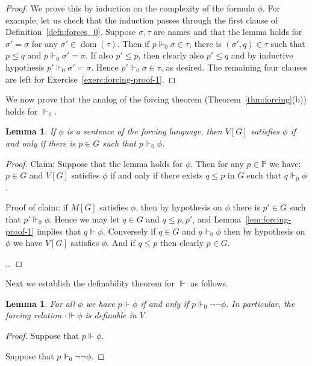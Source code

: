 \documentclass[11pt,oneside]{amsbook}
\newcommand{\forces}{\Vdash}
\newcommand{\PP}{\mathbb P}
\DeclareMathOperator{\dom}{dom}
\theoremstyle{definition}
\theoremstyle{plain}
\newtheorem{lem}[thm]{Lemma}
\theoremstyle{definition}
\theoremstyle{remark}
\begin{document}
\begin{proof}
  We prove this by induction on the complexity of the formula $\phi$. For example, let us check that the induction passes through the first clause of Definition~\ref{defn:forces_0}. Suppose $\sigma,\tau$ are names and that the lemma holds for $\sigma'=\sigma$ for any $\sigma'\in\dom(\tau)$. Then if $p\forces_0\sigma\in\tau$, there is $(\sigma',q)\in\tau$ such that $p\leq q$ and $p\forces_0\sigma'=\sigma$. If also $p'\leq p$, then clearly also $p'\leq q$ and by inductive hypothesis $p'\forces_0\sigma'=\sigma$. Hence $p'\forces_0\sigma\in\tau$, as desired. The remaining four clauses are left for Exercise~\ref{exerc:forcing-proof-1}.
\end{proof}


We now prove that the analog of the forcing theorem (Theorem~\ref{thm:forcing}(b)) holds for $\forces_0$.

\begin{lem}
  If $\phi$ is a sentence of the forcing language, then $V[G]$ satisfies $\phi$ if and only if there is $p\in G$ such that $p\forces_0\phi$.
\end{lem}

\begin{proof}
  Claim: Suppose that the lemma holds for $\phi$. Then for any $p\in\PP$ we have: $p\in G$ and $V[G]$ satisfies $\phi$ if and only if there exists $q\leq p$ in $G$ such that $q\forces_0\phi$.

  Proof of claim: if $M[G]$ satisfies $\phi$, then by hypothesis on $\phi$ there is $p'\in G$ such that $p'\forces_0\phi$. Hence we may let $q\in G$ and $q\leq p,p'$, and Lemma~\ref{lem:forcing-proof-1} implies that $q\forces\phi$. Conversely if $q\in G$ and $q\forces_0\phi$ then by hypothesis on $\phi$ we have $V[G]$ satisfies $\phi$. And if $q\leq p$ then clearly $p\in G$.

  \ldots
\end{proof}

Next we establish the definability theorem for $\forces$ as follows.

\begin{lem}
  For all $\phi$ we have $p\forces\phi$ if and only if $p\forces_0\neg\neg\phi$. In particular, the forcing relation $\cdot\forces\phi$ is definable in $V$.
\end{lem}

\begin{proof}
  Suppose that $p\forces\phi$.

  Suppose that $p\forces_0\neg\neg\phi$.
\end{proof}
\end{document}
